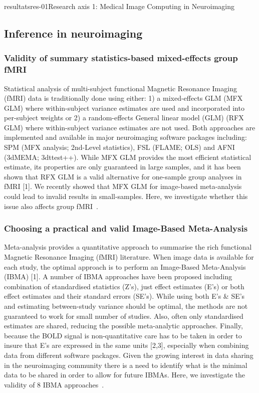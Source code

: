 \documentclass{ra2018}
\begin{document}
\begin{module}{resultats}{res-01}{Research axis 1: Medical Image Computing in Neuroimaging}
\subsection{Inference in neuroimaging}
\subsubsection{Validity of summary statistics-based mixed-effects group fMRI}
\begin{participants}
\end{participants}
Statistical analysis of multi-subject functional Magnetic Resonance Imaging (fMRI) data is traditionally done using either: 1) a mixed-effects GLM (MFX GLM) where within-subject variance estimates are used and incorporated into per-subject weights or 2) a random-effects General linear model (GLM) (RFX GLM) where within-subject variance estimates are not used. Both approaches are implemented and available in major neuroimaging software packages including: SPM (MFX analysis; 2nd-Level statistics), FSL (FLAME; OLS) and AFNI (3dMEMA; 3dttest++). While MFX GLM provides the most efficient statistical estimate, its properties are only guaranteed in large samples, and it has been shown that RFX GLM is a valid alternative for one-sample group analyses in fMRI [1]. We recently showed that MFX GLM for image-based meta-analysis could lead to invalid results in small-samples. Here, we investigate whether this issue also affects group fMRI~\cite{maumet:inserm-01887911}.

\subsubsection{Choosing a practical and valid Image-Based Meta-Analysis}
\begin{participants}
\end{participants}
Meta-analysis provides a quantitative approach to summarise the rich functional Magnetic Resonance Imaging (fMRI) literature. When image data is available for each study, the optimal approach is to perform an Image-Based Meta-Analysis (IBMA) [1]. A number of IBMA approaches have been proposed including combination of standardised statistics (Z's), just effect estimates (E's) or both effect estimates and their standard errors (SE's). While using both E’s \& SE’s and estimating between-study variance should be optimal, the methods are not guaranteed to work for small number of studies. Also, often only standardised estimates are shared, reducing the possible meta-analytic approaches. Finally, because the BOLD signal is non-quantitative care has to be taken in order to insure that E's are expressed in the same units [2,3], especially when combining data from different software packages. Given the growing interest in data sharing in the neuroimaging community there is a need to identify what is the minimal data to be shared in order to allow for future IBMAs. Here, we investigate the validity of 8 IBMA approaches~\cite{maumet:inserm-01933032}.


\end{module}
\end{document}
